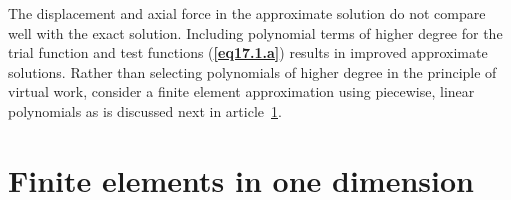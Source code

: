 \documentclass{AeroStructure-ERJohnson}
\begin{document}
\begin{example}
{\def\thefigure{17.2}
}


{\def\thefigure{17.3}
}


The displacement and axial force in the approximate solution do not compare well with the exact solution. Including polynomial terms of higher degree for the trial function and test functions (\textbf{\ref{eq17.1.a}}) results in improved approximate solutions. Rather than selecting polynomials of higher degree in the principle of virtual work, consider a finite element approximation using piecewise, linear polynomials as is discussed next in article~\ref{sec17.2}.
\end{example}

\vspace*{-1pc}

\section{Finite elements in one dimension}\label{sec17.2}
\end{document}
